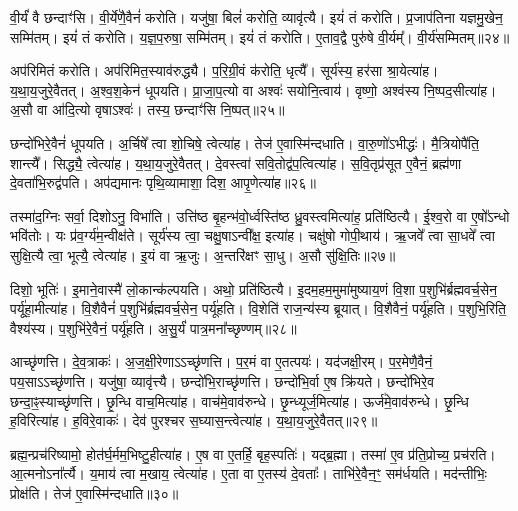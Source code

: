 वी॒र्यं॑ वै छन्दाꣳ॑सि। 
वी॒र्ये॑णै॒वैनं॑ करोति। 
यजु॑षा॒ बिलं॑ करोति॒ व्यावृ॑त्यै। 
इयं॑ तं करोति। 
प्र॒जाप॑तिना यज्ञमु॒खेन॒ सम्मि॑तम्। 
इयं॑ तं करोति। 
य॒ज्ञ॒प॒रुषा॒ सम्मि॑तम्। 
इयं॑ तं करोति। 
ए॒ताव॒द्वै पुरु॑षे वी॒र्यम्᳚। 
वी॒र्य॑सम्मितम्॥२४॥

अप॑रिमितं करोति। 
अप॑रिमित॒स्याव॑रुद्ध्यै। 
प॒रि॒ग्री॒वं क॑रोति॒ धृत्यै᳚। 
सूर्य॑स्य॒ हर॑सा श्रा॒येत्या॑ह। 
य॒था॒य॒जुरे॒वैतत्। 
अ॒श्व॒श॒केन॑ धूपयति। 
प्रा॒जा॒प॒त्यो वा अश्वः॑ सयोनि॒त्वाय॑। 
वृष्णो॒ अश्व॑स्य नि॒ष्पद॒सीत्या॑ह। 
अ॒सौ वा आ॑दि॒त्यो वृषाऽश्वः॑। 
तस्य॒ छन्दाꣳ॑सि नि॒ष्पत्॥२५॥

छन्दो॑भिरे॒वैनं॑ धूपयति। 
अ॒र्चिषे᳚ त्वा शो॒चिषे॒ त्वेत्या॑ह। 
तेज॑ ए॒वास्मि॑न्दधाति। 
वा॒रु॒णो॑ऽभीद्धः॑। 
मै॒त्रियोपै॑ति॒ शान्त्यै᳚। 
सिद्ध्यै॒ त्वेत्या॑ह। 
य॒था॒य॒जुरे॒वैतत्। 
दे॒वस्त्वा॑ सवि॒तोद्व॑प॒त्वित्या॑ह। 
स॒वि॒तृप्र॑सूत ए॒वैनं॒ ब्रह्म॑णा दे॒वता॑भि॒रुद्व॑पति। 
अप॑द्यमानः पृथि॒व्यामाशा॒ दिश॒ आपृ॒णेत्या॑ह॥२६॥

तस्मा॑द॒ग्निः सर्वा॒ दिशोऽनु॒ विभा॑ति। 
उत्ति॑ष्ठ बृ॒हन्भ॑वो॒र्ध्वस्ति॑ष्ठ ध्रु॒वस्त्वमित्या॑ह॒ प्रति॑ष्ठित्यै। 
ई॒श्व॒रो वा ए॒षो᳚ऽन्धो भवि॑तोः। 
यः प्र॑व॒र्ग्य॑म॒न्वीक्ष॑ते। 
सूर्य॑स्य त्वा॒ चक्षु॒षाऽन्वी᳚क्ष॒ इत्या॑ह। 
चक्षु॑षो गोपी॒थाय॑। 
ऋ॒जवे᳚ त्वा सा॒धवे᳚ त्वा सुक्षि॒त्यै त्वा॒ भूत्यै॒ त्वेत्या॑ह। 
इ॒यं वा ऋ॒जुः। 
अ॒न्तरि॑क्षꣳ सा॒धु। 
अ॒सौ सु॑क्षि॒तिः॥२७॥

दिशो॒ भूतिः॑। 
इ॒माने॒वास्मै॑ लो॒कान्क॑ल्पयति। 
अथो॒ प्रति॑ष्ठित्यै। 
इ॒दम॒हम॒मुमा॑मुष्याय॒णं  वि॒शा प॒शुभि॑र्ब्रह्मवर्च॒सेन॒ पर्यू॑हा॒मीत्या॑ह। 
वि॒शैवैनं॑ प॒शुभि॑र्ब्रह्मवर्च॒सेन॒ पर्यू॑हति। 
वि॒शेति॑ राज॒न्य॑स्य ब्रूयात्। 
वि॒शैवैनं॒ पर्यू॑हति। 
प॒शुभि॒रिति॒ वैश्य॑स्य। 
प॒शुभि॑रे॒वैनं॒ पर्यू॑हति। 
अ॒सु॒र्यं॑ पात्र॒मना᳚च्छृण्णम्॥२८॥

आच्छृ॑णत्ति। 
दे॒व॒त्राकः॑। 
अ॒ज॒क्षी॒रेणाऽऽच्छृ॑णत्ति। 
प॒र॒मं वा ए॒तत्पयः॑। 
यद॑जक्षी॒रम्। 
प॒र॒मेणै॒वैनं॒ पय॒साऽऽच्छृ॑णत्ति। 
यजु॑षा॒ व्यावृ॑त्त्यै। 
छन्दो॑भि॒राच्छृ॑णत्ति। 
छन्दो॑भि॒र्वा ए॒ष क्रि॑यते। 
छन्दो॑भिरे॒व छन्दा॒ꣴ॒स्याच्छृ॑णत्ति। 
छृ॒न्धि वाच॒मित्या॑ह। 
वाच॑मे॒वाव॑रुन्धे। 
छृ॒न्ध्यूर्ज॒मित्या॑ह। 
ऊर्ज॑मे॒वाव॑रुन्धे। 
छृ॒न्धि ह॒विरित्या॑ह। 
ह॒विरे॒वाकः॑। 
देव॑ पुरश्चर स॒घ्यास॒न्त्वेत्या॑ह। 
य॒था॒य॒जुरे॒वैतत्॥२९॥%
\anuvakamend[स्या॒द्यत्प्र॑व॒र्ग्य॑श्छन्दो॑भिः करोति वी॒र्य॑सम्मितं॒ छन्दाꣳ॑सि नि॒ष्पत्पृ॒णेत्या॑ह सुक्षि॒तिरना᳚च्छृण्ण॒ञ्छन्दा॒ꣴ॒स्या\-च्छृ॑णत्त्य॒ष्टौ च॑]

ब्रह्म॒न्प्रच॑रिष्यामो॒ होत॑र्घ॒र्मम॒भिष्टु॒हीत्या॑ह। 
ए॒ष वा ए॒तर्\mbox{}हि॒ बृह॒स्पतिः॑। 
यद्ब्र॒ह्मा। 
तस्मा॑ ए॒व प्र॑ति॒प्रोच्य॒ प्रच॑रति। 
आ॒त्मनोऽना᳚र्त्यै। 
य॒माय॑ त्वा म॒खाय॒ त्वेत्या॑ह। 
ए॒ता वा ए॒तस्य॑ दे॒वताः᳚। 
ताभि॑रे॒वैन॒ꣳ॒ सम॑र्धयति। 
मद॑न्तीभिः॒ प्रोक्ष॑ति। 
तेज॑ ए॒वास्मि॑न्दधाति॥३०॥

